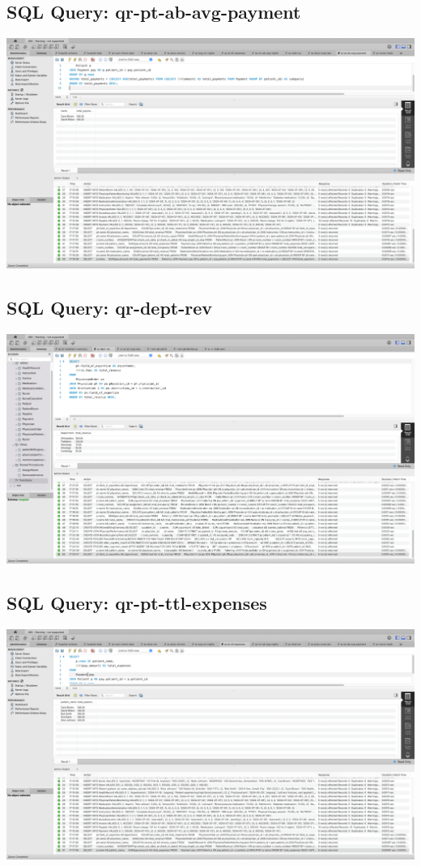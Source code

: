 \documentclass[a4paper,11pt]{article}
\theoremstyle{mytheor}
\begin{document}
\subsection{SQL Query: qr-pt-ab-avg-payment}
\includegraphics[width=\textwidth]{Screenshots/SCR-20240727-peua.png}

\subsection{SQL Query: qr-dept-rev}
\includegraphics[width=\textwidth]{Screenshots/SCR-20240727-phar.png}

\subsection{SQL Query: qr-pt-ttl-expenses}
\includegraphics[width=\textwidth]{Screenshots/SCR-20240727-pemq.png}
\end{document}
